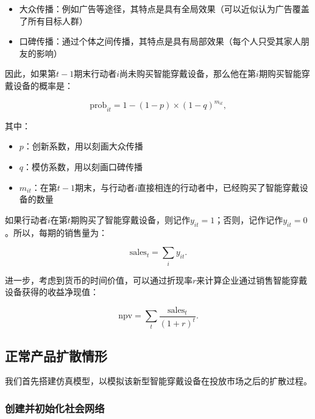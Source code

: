 \documentclass[]{article}
\providecommand{\tightlist}{%
  \setlength{\itemsep}{0pt}\setlength{\parskip}{0pt}}
\begin{document}
\begin{itemize}
\tightlist
\item
  大众传播：例如广告等途径，其特点是具有全局效果（可以近似认为广告覆盖了所有目标人群）
\item
  口碑传播：通过个体之间传播，其特点是具有局部效果（每个人只受其家人朋友的影响）
\end{itemize}

因此，如果第\(t - 1\)期末行动者\(i\)尚未购买智能穿戴设备，那么他在第\(i\)期购买智能穿戴设备的概率是：

\begin{equation}
  \text{prob}_{it} = 1 - (1 - p) \times (1 - q) ^ {m_{it}},
\end{equation}

其中：

\begin{itemize}
\tightlist
\item
  \(p\)：创新系数，用以刻画大众传播
\item
  \(q\)：模仿系数，用以刻画口碑传播
\item
  \(m_{it}\)：在第\(t - 1\)期末，与行动者\(i\)直接相连的行动者中，已经购买了智能穿戴设备的数量
\end{itemize}

如果行动者\(i\)在第\(t\)期购买了智能穿戴设备，则记作\(y_{it} = 1\)；否则，记作记作\(y_{it} = 0\)。所以，每期的销售量为：

\begin{equation}
  \text{sales}_{t} = \sum_{i} y_{it}.
\end{equation}

进一步，考虑到货币的时间价值，可以通过折现率\(r\)来计算企业通过销售智能穿戴设备获得的收益净现值：

\begin{equation}
  \text{npv} = \sum_{t} \frac{\text{sales}_{t}}{(1 + r)^{t}}.
\end{equation}

\subsection{正常产品扩散情形}

我们首先搭建仿真模型，以模拟该新型智能穿戴设备在投放市场之后的扩散过程。

\subsubsection{创建并初始化社会网络}
\end{document}
